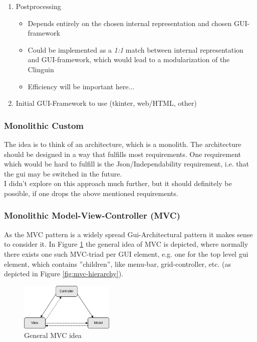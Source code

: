 \documentclass[12pt,a4paper]{article}
\newcommand{\<}[1]{\guilsinglleft}
\renewcommand{\>}[1]{\guilsinglright}
\begin{document}
\begin{enumerate}
\begin{itemize}
\begin{itemize}
        \end{itemize}
    \end{itemize}
    \item Postprocessing
    \begin{itemize}
        \item Depends entirely on the chosen internal representation and chosen GUI-framework
        \item Could be implemented as a \textit{1:1} match between internal representation and GUI-framework, which would lead to a modularization of the Clinguin
        \item Efficiency will be important here...
    \end{itemize}
    \item Initial GUI-Framework to use (tkinter, web/HTML, other)
\end{enumerate}


\subsubsection{Monolithic Custom}

\noindent The idea is to think of an architecture, which is a monolith. The architecture should be designed in a way that fulfills most requirements. One requirement which would be hard to fulfill is the Json/Independability requirement, i.e. that the gui may be switched in the future.\\
I didn't explore on this approach much further, but it should definitely be possible, if one drops the above mentioned requirements.

\subsubsection{Monolithic Model-View-Controller (MVC)}

\noindent As the MVC pattern is a widely spread Gui-Architectural pattern it makes sense to consider it. In Figure \ref{fig:mvc} the general idea of MVC is depicted, where normally there exists one such MVC-triad per GUI element, e.g. one for the top level gui element, which contains ''children'', like menu-bar, grid-controller, etc. (as depicted in Figure \ref{fig:mvc-hierarchy}).\\


\begin{figure}[ht]
    \begin{center}
    \includegraphics[width=0.4\textwidth]{imgs/mvc.png}
    \caption{General MVC idea}
    \label{fig:mvc}
    \end{center}
\end{figure}
\end{document}
